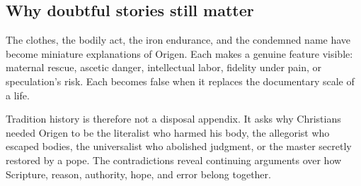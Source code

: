 \subsection{Why doubtful stories still matter}

The clothes, the bodily act, the iron endurance, and the condemned name have
become miniature explanations of Origen. Each makes a genuine feature visible:
maternal rescue, ascetic danger, intellectual labor, fidelity under pain, or
speculation's risk. Each becomes false when it replaces the documentary scale
of a life.

Tradition history is therefore not a disposal appendix. It asks why Christians
needed Origen to be the literalist who harmed his body, the allegorist who
escaped bodies, the universalist who abolished judgment, or the master secretly
restored by a pope. The contradictions reveal continuing arguments over how
Scripture, reason, authority, hope, and error belong together.
